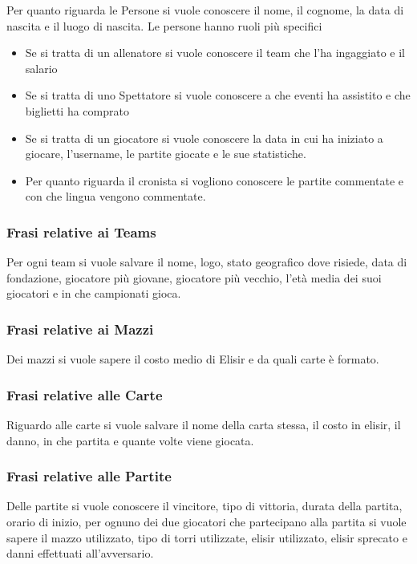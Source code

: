 \documentclass{article}
\begin{document}
Per quanto riguarda le Persone si vuole conoscere il nome, il cognome, la data di nascita e il luogo di nascita. Le persone hanno ruoli più specifici
\begin{itemize}
    \item Se si tratta di un allenatore si vuole conoscere il team che l'ha ingaggiato e il salario
    \item Se si tratta di uno Spettatore si vuole conoscere a che eventi ha assistito e che biglietti ha comprato
    \item Se si tratta di un giocatore si vuole conoscere la data in cui ha iniziato a giocare, l'username, le partite giocate e le sue statistiche.
    \item Per quanto riguarda il cronista si vogliono conoscere le partite commentate e con che lingua vengono commentate.
\end{itemize}

\subsubsection{Frasi relative ai Teams}

Per ogni team si vuole salvare il nome, logo, stato geografico dove risiede, data di fondazione, giocatore più giovane, giocatore più vecchio, l'età media dei suoi giocatori e in che campionati gioca.

\subsubsection{Frasi relative ai Mazzi}

Dei mazzi si vuole sapere il costo medio di Elisir e da quali carte è formato.

\subsubsection{Frasi relative alle Carte}

Riguardo alle carte si vuole salvare il nome della carta stessa, il costo in elisir, il danno, in che partita e quante volte viene giocata.

\subsubsection{Frasi relative alle Partite}

Delle partite si vuole conoscere il vincitore, tipo di vittoria, durata della partita, orario di inizio, per ognuno dei due giocatori che partecipano alla partita si vuole sapere il mazzo utilizzato, tipo di torri utilizzate, elisir utilizzato, elisir sprecato e danni effettuati all'avversario.
\end{document}

